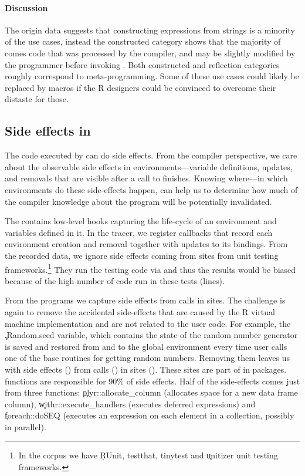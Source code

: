\documentclass[review,screen,acmsmall,anonymous=true]{acmart}
\begin{document}
\paragraph{Discussion}
The origin data suggests that constructing expressions from strings is a
minority of the use cases, instead the constructed category shows that the
majority of \evals comes code that was processed by the compiler, and may be
slightly modified by the programmer before invoking \eval. Both constructed and
reflection categories roughly correspond to meta-programming. Some of these use
cases could likely be replaced by macros if the R designers could be convinced
to overcome their distaste for those.

\subsection{Side effects in \eval}

The code executed by \eval can do side effects. From the compiler perspective,
we care about the observable side effects in environments---\ie variable
definitions, updates, and removals that are visible after a call to \eval
finishes. Knowing where---\ie in which environments do these side-effects
happen, can help us to determine how much of the compiler knowledge about the
program will be potentially invalidated.

The \rdyntrace contains low-level hooks capturing the life-cycle of an
environment and variables defined in it. In the tracer, we register callbacks
that record each environment creation and removal together with updates to its
bindings. From the recorded data, we ignore side effects
coming from \eval sites from unit testing frameworks.\footnote{In the corpus we
have \c{RUnit, testthat, tinytest} and \c{unitizer} unit testing frameworks.}
They run the testing code via \eval and thus the results would be biased
because of the high number of code run in these tests
(\CranRunnableCodeTestsRnd lines).

From the \packageNbrunsRnd programs we capture \SEAll side effects from
\SEAllCalls \eval calls in \SEAllSites sites. The challenge is again to remove
the accidental side-effects that are caused by the R virtual machine
implementation and are not related to the user code. For example, the
\c{.Random.seed} variable, which contains the state of the random number
generator is saved and restored from and to the global environment every time
user calls one of the base routines for getting random numbers. Removing them
leaves us with \SEUser side effects (\SEUserRatio) from \SEUserCalls \eval
calls (\SEUserCallsRatio) in \SEUserSites sites (\SEUserSitesRatio). These
sites are part of \SEUserFunctions in \SEUserPackages packages. \SEFunsNighty
functions are responsible for 90\% of side effects. Half of the side-effects
comes just from three functions: \c{plyr::allocate\_column} (allocates space
for a new data frame column), \c{withr::execute\_handlers} (executes deferred
expressions) and \c{foreach::doSEQ} (executes an expression on each element in
a collection, possibly in parallel).
\end{document}
